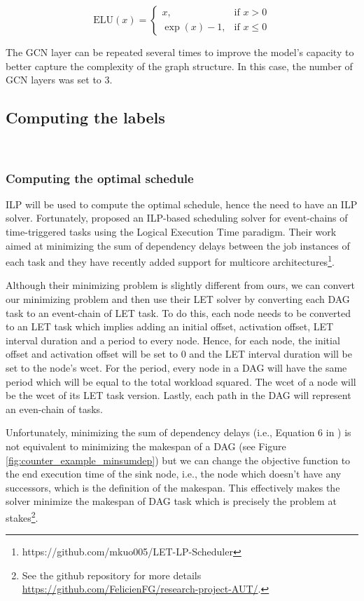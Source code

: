 \begin{equation}
\text{ELU}(x) = 
\begin{cases}
x, & \text{if } x > 0 \\
\exp(x) - 1, & \text{if } x \leq 0
\end{cases}
\label{eq:elu}
\end{equation}


The GCN layer can be repeated several times 
to improve the model's capacity to better
capture the complexity of the graph structure.
In this case, the number of GCN layers was set to 3.

\subsection{Computing the labels}
~
\label{sec:ilp_calculation}

\subsubsection{Computing the optimal schedule}

ILP will be used to compute the optimal schedule,
hence the need to have an ILP solver.
Fortunately, 
\citet{yip2023letsynchronise} proposed an ILP-based
scheduling solver for event-chains of time-triggered tasks
using the Logical Execution Time paradigm\cite{kirsch2012logical}.
Their work aimed at minimizing the sum of dependency delays 
between the job instances of each task and they have recently added
support for multicore architectures\footnote{https://github.com/mkuo005/LET-LP-Scheduler}.

Although their minimizing problem is slightly different from ours, 
we can convert our minimizing problem and then use their LET solver by converting each DAG task 
to an event-chain of LET task.
To do this, each node needs to be converted to an LET task which 
implies adding an initial offset, activation offset, LET interval duration and a period
to every node.
Hence, for each node, the initial offset and activation offset will
be set to 0 and the LET interval duration will be set to the node's wcet.
For the period, every node in a DAG will have the same period which will
be equal to the total workload squared.
The wcet of a node will be the wcet of its LET task version.
Lastly, each path in the DAG will represent an even-chain of tasks.

Unfortunately, minimizing the sum of dependency delays (i.e., Equation 6 in \citet{yip2023letsynchronise}) is not equivalent
to minimizing the makespan of a DAG (see Figure \ref{fig:counter_example_minsumdep})
but we can change the objective function to the end execution time
of the sink node, i.e., the node which doesn't have any successors,
which is the definition of the makespan.
This effectively makes the solver minimize the makespan of DAG task
which is precisely the problem at stakes\footnote{See the github repository for more details \url{https://github.com/FelicienFG/research-project-AUT/}.}.

